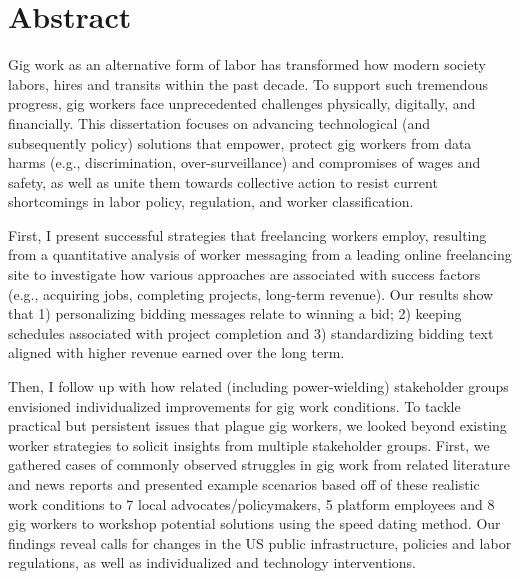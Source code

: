 \begingroup
\let\clearpage\relax
\let\cleardoublepage\relax
\let\cleardoublepage\relax

\chapter*{Abstract}
Gig work as an alternative form of labor has transformed how modern society labors, hires and transits within the past decade. To support such tremendous progress, gig workers face unprecedented challenges physically, digitally, and financially. This dissertation focuses on advancing technological (and subsequently policy) solutions that empower, protect gig workers from data harms (e.g., discrimination, over-surveillance) and compromises of wages and safety, as well as unite them towards collective action to resist current shortcomings in labor policy, regulation, and worker classification. 


First, I present successful strategies that freelancing workers employ, resulting from a quantitative analysis of worker messaging from a leading online freelancing site to investigate how various approaches are associated with success factors (e.g., acquiring jobs, completing
projects, long-term revenue). Our results show that 1) personalizing bidding messages relate to winning a bid;
2) keeping schedules associated with project completion and 3) standardizing bidding text aligned with higher
revenue earned over the long term.

Then, I follow up with how related (including power-wielding) stakeholder groups envisioned individualized improvements for gig work conditions. To tackle practical but persistent issues that plague gig workers, we looked beyond existing worker strategies to solicit insights from multiple stakeholder groups. First, we gathered cases of commonly observed struggles
in gig work from related literature and news reports and presented example scenarios based off of these
realistic work conditions to 7 local advocates/policymakers, 5 platform employees and 8 gig workers to workshop potential solutions using the speed dating method. Our findings reveal calls for changes in the US public infrastructure, policies and labor regulations, as well as individualized and technology interventions.


